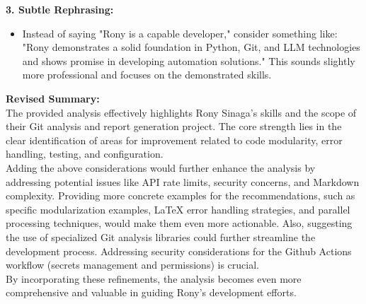 \documentclass{article}
\begin{document}
\begin{itemize}
\begin{itemize}
\begin{itemize}
        \end{itemize}
        \textbf{3. Subtle Rephrasing:}
        \begin{itemize}
            \item Instead of saying "Rony is a capable developer," consider something like: "Rony demonstrates a solid foundation in Python, Git, and LLM technologies and shows promise in developing automation solutions." This sounds slightly more professional and focuses on the demonstrated skills.
        \end{itemize}
                \textbf{Revised Summary:}\\
        The provided analysis effectively highlights Rony Sinaga's skills and the scope of their Git analysis and report generation project. The core strength lies in the clear identification of areas for improvement related to code modularity, error handling, testing, and configuration. \\
        Adding the above considerations would further enhance the analysis by addressing potential issues like API rate limits, security concerns, and Markdown complexity. Providing more concrete examples for the recommendations, such as specific modularization examples, LaTeX error handling strategies, and parallel processing techniques, would make them even more actionable. Also, suggesting the use of specialized Git analysis libraries could further streamline the development process.  Addressing security considerations for the Github Actions workflow (secrets management and permissions) is crucial.\\
        By incorporating these refinements, the analysis becomes even more comprehensive and valuable in guiding Rony's development efforts.


\end{itemize}
\end{itemize}
\end{document}
